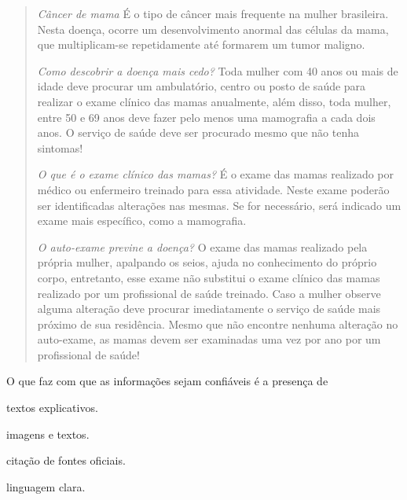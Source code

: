 \begin{quote}

\textit{Câncer de mama}
É o tipo de câncer mais frequente na mulher brasileira. Nesta doença,
ocorre um desenvolvimento anormal das células da mama, que
multiplicam-se repetidamente até formarem um tumor maligno.

\textit{Como descobrir a doença mais cedo?}
Toda mulher com 40 anos ou mais de idade deve procurar um ambulatório,
centro ou posto de saúde para realizar o exame clínico das mamas
anualmente, além disso, toda mulher, entre 50 e 69 anos deve fazer pelo
menos uma mamografia a cada dois anos. O serviço de saúde deve ser
procurado mesmo que não tenha sintomas!

\textit{O que é o exame clínico das mamas?}
É o exame das mamas realizado por médico ou enfermeiro treinado para
essa atividade. Neste exame poderão ser identificadas alterações nas
mesmas. Se for necessário, será indicado um exame mais específico, como
a mamografia.

\textit{O auto-exame previne a doença?}
O exame das mamas realizado pela própria mulher, apalpando os seios,
ajuda no conhecimento do próprio corpo, entretanto, esse exame não
substitui o exame clínico das mamas realizado por um profissional de
saúde treinado. Caso a mulher observe alguma alteração deve procurar
imediatamente o serviço de saúde mais próximo de sua residência. Mesmo
que não encontre nenhuma alteração no auto-exame, as mamas devem ser
examinadas uma vez por ano por um profissional de saúde!

\end{quote}


O que faz com que as
informações sejam confiáveis é a presença de

\begin{escolha}
    
    \item textos explicativos.
    
    \item imagens e textos.
    
    \item citação de fontes oficiais.
    
    \item linguagem clara.

\end{escolha}

